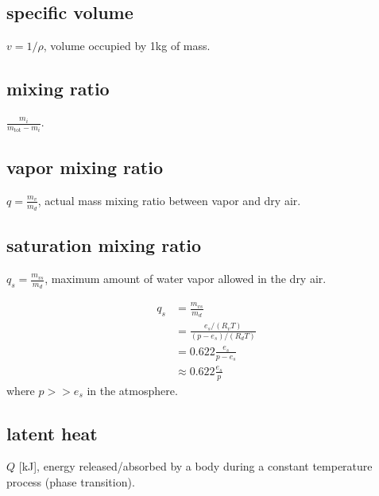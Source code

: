 \subsection{specific volume}
\begin{defn*} $v = 1/\rho$, volume occupied by 1kg of mass.
\end{defn*}

\subsection{mixing ratio}
\begin{defn*} $ \frac{m_i}{m_{\text{tot}}-m_i} $.
\end{defn*}

\subsection{vapor mixing ratio}
\begin{defn*} $ q = \frac{m_v}{m_d}$, actual mass mixing ratio between vapor and dry air.
\end{defn*}

\subsection{saturation mixing ratio}
\begin{defn*} $ q_s = \frac{m_{vs}}{m_d}$, maximum amount of water vapor allowed in the dry air.
\end{defn*}
\begin{derv*} 
\begin{equation}
\begin{aligned}
   q_s & = \frac{m_{vs}}{m_d} \\
       & = \frac{e_s/(R_v T)}{(p-e_s)/(R_dT)} \\
       & = 0.622\frac{e_s}{p-e_s} \\
       & \approx 0.622\frac{e_s}{p}
\end{aligned}
\end{equation}
where $p >> e_s$ in the atmosphere.
\end{derv*} 

\subsection{latent heat}
\begin{defn*} $Q$ [kJ], energy released/absorbed by a body during a constant temperature process
(phase transition).
\end{defn*}

